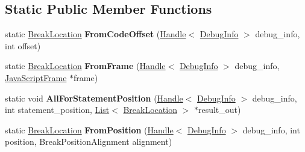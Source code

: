 \subsection*{Static Public Member Functions}
\begin{DoxyCompactItemize}
\item 
static \hyperlink{classv8_1_1internal_1_1_break_location}{Break\+Location} {\bfseries From\+Code\+Offset} (\hyperlink{classv8_1_1internal_1_1_handle}{Handle}$<$ \hyperlink{classv8_1_1internal_1_1_debug_info}{Debug\+Info} $>$ debug\+\_\+info, int offset)\hypertarget{classv8_1_1internal_1_1_break_location_a22d2fb7fb61fc38f1f57b055a2e70ecc}{}\label{classv8_1_1internal_1_1_break_location_a22d2fb7fb61fc38f1f57b055a2e70ecc}

\item 
static \hyperlink{classv8_1_1internal_1_1_break_location}{Break\+Location} {\bfseries From\+Frame} (\hyperlink{classv8_1_1internal_1_1_handle}{Handle}$<$ \hyperlink{classv8_1_1internal_1_1_debug_info}{Debug\+Info} $>$ debug\+\_\+info, \hyperlink{classv8_1_1internal_1_1_java_script_frame}{Java\+Script\+Frame} $\ast$frame)\hypertarget{classv8_1_1internal_1_1_break_location_ae044ee54e8b28e0325c040be247a3c7d}{}\label{classv8_1_1internal_1_1_break_location_ae044ee54e8b28e0325c040be247a3c7d}

\item 
static void {\bfseries All\+For\+Statement\+Position} (\hyperlink{classv8_1_1internal_1_1_handle}{Handle}$<$ \hyperlink{classv8_1_1internal_1_1_debug_info}{Debug\+Info} $>$ debug\+\_\+info, int statement\+\_\+position, \hyperlink{classv8_1_1internal_1_1_list}{List}$<$ \hyperlink{classv8_1_1internal_1_1_break_location}{Break\+Location} $>$ $\ast$result\+\_\+out)\hypertarget{classv8_1_1internal_1_1_break_location_ad290061e5fb57f16ac7d340957a26add}{}\label{classv8_1_1internal_1_1_break_location_ad290061e5fb57f16ac7d340957a26add}

\item 
static \hyperlink{classv8_1_1internal_1_1_break_location}{Break\+Location} {\bfseries From\+Position} (\hyperlink{classv8_1_1internal_1_1_handle}{Handle}$<$ \hyperlink{classv8_1_1internal_1_1_debug_info}{Debug\+Info} $>$ debug\+\_\+info, int position, Break\+Position\+Alignment alignment)\hypertarget{classv8_1_1internal_1_1_break_location_a23ef51a6318f97cb20b0f2de388ebebb}{}\label{classv8_1_1internal_1_1_break_location_a23ef51a6318f97cb20b0f2de388ebebb}

\end{DoxyCompactItemize}
